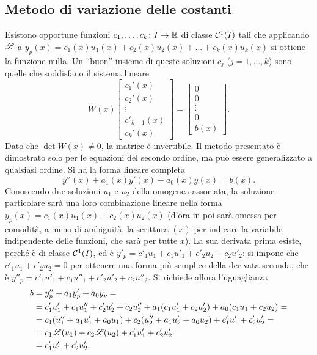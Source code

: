 \subsection*{Metodo di variazione delle costanti}
Esistono opportune funzioni $c_1,\dots,c_k\colon I\to\mathbb{R}$ di classe $\mathcal{C}^{{1}}(I)$ tali che applicando $\mathscr L$ a $y_p(x)=c_1(x)u_1(x)+c_2(x)u_2(x)+\dots+c_k(x)u_k(x)$ si ottiene la funzione nulla. Un ``buon'' insieme di queste soluzioni $c_j$ ($j=1,\dots,k$) sono quelle che soddisfano il sistema lineare
\begin{equation}
W(x)\begin{bmatrix}c_1'(x)\\c_2'(x)\\\vdots\\c'_{k-1}(x)\\c_k'(x)\end{bmatrix}=
\begin{bmatrix}0\\0\\\vdots\\0\\b(x)\end{bmatrix}.
\end{equation}
Dato che $\det W(x)\neq 0$, la matrice è invertibile.
Il metodo presentato è dimostrato solo per le equazioni del secondo ordine, ma può essere generalizzato a qualsiasi ordine.
Si ha la forma lineare completa
\begin{equation} \label{eq:lin-2}
y''(x)+a_1(x)y'(x)+a_0(x)y(x)=b(x).
\end{equation}
Conoscendo due soluzioni $u_1$ e $u_2$ della omogenea associata, la soluzione particolare sarà una loro combinazione lineare nella forma $y_p(x)=c_1(x)u_1(x)+c_2(x)u_2(x)$ (d'ora in poi sarà omessa per comodità, a meno di ambiguità, la scrittura $(x)$ per indicare la variabile indipendente delle funzioni, che sarà per tutte $x$). La sua derivata prima esiste, perché è di classe $\mathcal{C}^{{1}}(I)$, ed è $y'_p=c'_1u_1+c_1u'_1+c'_2u_2+c_2u'_2$: si impone che $c'_1u_1+c'_2u_2=0$ per ottenere una forma più semplice della derivata seconda, che è $y''_p=c'_1u'_1+c_1u''_1+c'_2u'_2+c_2u''_2$. Si richiede allora l'uguaglianza
\[\begin{split}
b	&=y''_p+a_1y'_p+a_0y_p=\\
	&=c'_1u'_1+c_1u''_1+c'_2u'_2+c_2u''_2+a_1(c_1u'_1+c_2u'_2)+a_0(c_1u_1+c_2u_2)=\\
	&=c_1(u''_1+a_1u'_1+a_0u_1)+c_2(u''_2+a_1u'_2+a_0u_2)+c'_1u'_1+c'_2u'_2=\\
	&=c_1\mathscr L(u_1)+c_2\mathscr L(u_2)+c'_1u'_1+c'_2u'_2=\\
	&=c'_1u'_1+c'_2u'_2.
\end{split}\]
